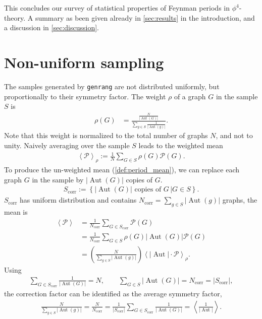 \documentclass[12pt,a4paper]{article}
\newcommand{\abs}[1]{\lvert #1 \rvert}
\newcommand{\period}{\mathcal P}
\newcommand{\Aut}{\operatorname{Aut}}
\renewcommand{\|}{\rule[-0.4ex]{0.2ex}{1.2em}}
\begin{document}
\bigskip

This concludes our survey of statistical properties of Feynman periods in $\phi^4$-theory. A summary as been given already in \cref{sec:results} in the introduction, and a discussion in \cref{sec:discussion}.

\FloatBarrier





\appendix


\section{Non-uniform sampling}\label{sec:uniform_sampling}
The samples generated by \texttt{genrang} are not distributed uniformly, but proportionally to their symmetry factor. The weight $\rho$ of a graph $G$ in the sample $S$ is 
\begin{align*}
	\rho(G) &= \frac{\frac{N}{\abs{\Aut(G)}}}{\sum_{g\in S} \frac{1}{\abs{\Aut(g)}}}.
\end{align*}
Note that this weight is normalized to the total number of graphs $N$, and not to unity. Naively averaging over the sample $S$ leads to the weighted mean
\begin{align*}
	\left \langle \period \right \rangle _\rho := \frac 1 N\sum_{G\in S} \rho(G)\period(G).
\end{align*}
To produce the un-weighted mean (\cref{def:period_mean}), we can replace each graph $G$ in the sample by $\abs{\Aut(G)}$ copies of $G$. 
\begin{align}\label{def:Scorr}
S_\text{corr}:= \left \lbrace \abs{\Aut(G)}\text{ copies of }G \, \Big| G\in S \right \rbrace  .
\end{align}
$S_\text{corr}$ has uniform distribution and contains $N_\text{corr}=\sum_{g\in S}\abs{\Aut(g)}$ graphs, the mean is
\begin{align*}
	\left \langle \period \right \rangle &=  \frac{1}{ N_\text{corr} } \sum_{G\in S_\text{corr}}    \period(G)\\ &= \frac{1}{ N_\text{corr}  } \sum_{G\in S} \rho(G) \abs{\Aut(G)}  \period(G)\\ &= \left( \frac{N}{\sum_{g\in S}\abs{\Aut(g)}} \right) \left \langle \abs{\Aut } \cdot \period  \right \rangle _\rho.
\end{align*}
Using
\begin{align*}
	\sum_{G \in S_\text{corr}} \frac{1}{\abs{\Aut(G)}} = N , \qquad  \sum_{G\in S} \abs{\Aut(G)}=N_\text{corr}=\abs{S_\text{corr}},
\end{align*}
the correction factor can be identified as the average symmetry factor,
\begin{align}\label{average_symfactor}
\frac{N}{\sum_{g\in S}\abs{\Aut(g)}} =	\frac{N}{N_\text{corr}} = \frac{1}{\abs{S_\text{corr}}}\sum_{G\in S_\text{corr}} \frac{1}{\abs{\Aut(G)}} =\left \langle \frac{1}{\abs{\Aut}} \right \rangle.
\end{align}
\end{document}
